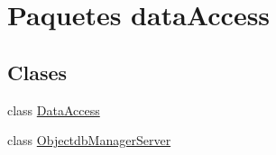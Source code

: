\hypertarget{namespacedata_access}{}\section{Paquetes data\+Access}
\label{namespacedata_access}
\subsection*{Clases}
\begin{DoxyCompactItemize}
\item 
class \mbox{\hyperlink{classdata_access_1_1_data_access}{Data\+Access}}
\item 
class \mbox{\hyperlink{classdata_access_1_1_objectdb_manager_server}{Objectdb\+Manager\+Server}}
\end{DoxyCompactItemize}
